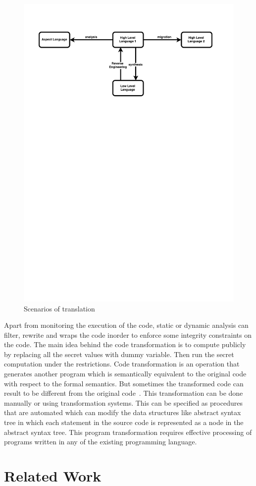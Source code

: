 \begin{figure}[!htb]
\centering
\includegraphics[trim=0.0cm 0.0cm 0.0cm 0.0cm, scale=0.9]{pdf/Taxonomy.pdf}
\vspace{-14.5cm}
\caption{Scenarios of translation}
\label{fig:taxonomy}
\end{figure}
Apart from monitoring the execution of the code, 
static or dynamic analysis can filter,
rewrite and wraps the code inorder to enforce some integrity 
constraints on the code.
The main idea behind the code transformation is to
compute publicly by replacing
all the secret values with dummy variable. Then run the secret computation
under the restrictions. Code transformation is an operation that generates
another program which is semantically equivalent to the original code with
respect to the formal semantics. But sometimes the transformed code can result
to be different from the original code~\cite{Ward:code}. 
This transformation can be done 
manually or using transformation systems. This can be specified as procedures
that are automated which can modify the data structures like abstract syntax tree
in which each statement in the source code is represented as a node in the 
abstract syntax tree. This program transformation
requires effective processing of programs written in any of
the existing programming language.

\chapter{Related Work}
\label{chapter:related}